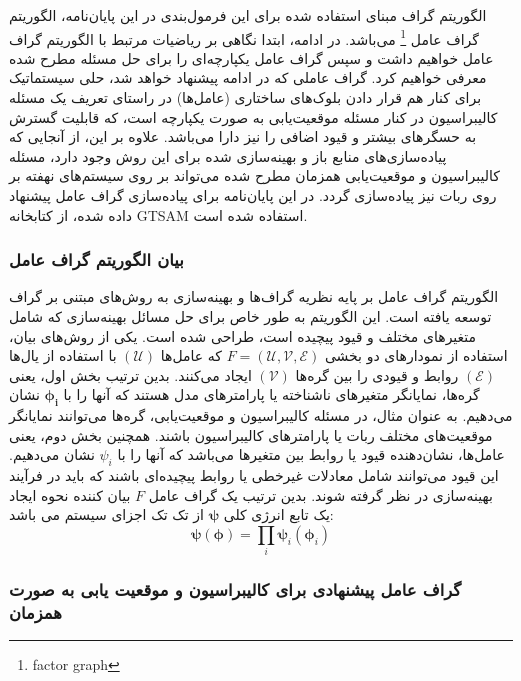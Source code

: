 الگوریتم گراف مبنای استفاده شده برای این فرمول‌بندی در این پایان‌نامه، الگوریتم گراف عامل
\footnote{factor graph}
می‌باشد. در ادامه، ابتدا نگاهی بر ریاضیات مرتبط با الگوریتم گراف عامل خواهیم داشت و سپس گراف عامل یکپارچه‌ای را برای حل مسئله مطرح شده معرفی خواهیم کرد. گراف عاملی که در ادامه پیشنهاد خواهد شد، حلی سیستماتیک برای کنار هم قرار دادن بلوک‌های ساختاری (عامل‌ها) در راستای تعریف یک مسئله کالیبراسیون در کنار مسئله موقعیت‌یابی به صورت یکپارچه است، که قابلیت گسترش به حسگرهای بیشتر و قیود اضافی را نیز دارا می‌باشد. علاوه بر این، از آنجایی که پیاده‌سازی‌های منابع باز و بهینه‌سازی شده برای این روش وجود دارد، مسئله کالیبراسیون و موقعیت‌یابی همزمان مطرح شده می‌تواند بر روی سیستم‌های نهفته بر روی ربات نیز پیاده‌سازی گردد. در این پایان‌نامه برای پیاده‌سازی گراف عامل پیشنهاد داده شده، از کتابخانه GTSAM استفاده شده است. 

\subsubsection{بیان الگوریتم گراف عامل}
الگوریتم گراف عامل بر پایه نظریه گراف‌ها و بهینه‌سازی به روش‌های مبتنی بر گراف توسعه یافته است. این الگوریتم به طور خاص برای حل مسائل بهینه‌سازی که شامل متغیرهای مختلف و قیود پیچیده است، طراحی شده است. یکی از روش‌های بیان، استفاده از نمودارهای دو بخشی
$F = (\mathcal{U}, \mathcal{V}, \mathcal{E})$
که  عامل‌ها 
$(\mathcal{U})$
با استفاده از یال‌ها
$(\mathcal{E})$
روابط و قیودی را بین گره‌ها 
$(\mathcal{V})$
 ایجاد می‌کنند. بدین ترتیب بخش اول، یعنی گره‌ها، نمایانگر متغیرهای ناشناخته یا پارامترهای مدل هستند که آنها را با
$\boldsymbol{\phi_i}$
نشان می‌دهیم. به عنوان مثال، در مسئله کالیبراسیون و موقعیت‌یابی، گره‌ها می‌توانند نمایانگر موقعیت‌های مختلف ربات یا پارامترهای کالیبراسیون باشند. همچنین بخش دوم، یعنی عامل‌ها، نشان‌دهنده قیود یا روابط بین متغیرها می‌باشد که آنها را با
$\psi_i$
نشان می‌دهیم. این قیود می‌توانند شامل معادلات غیرخطی یا روابط پیچیده‌ای باشند که باید در فرآیند بهینه‌سازی در نظر گرفته شوند. بدین ترتیب یک گراف عامل 
$F$
بیان کننده نحوه ایجاد یک تابع انرژی کلی
$\boldsymbol{\psi}$
از تک تک اجزای سیستم می باشد:
\begin{equation} 
	\boldsymbol{\psi}(\boldsymbol{\phi}) = \prod_{i} \boldsymbol{\psi}_i(\boldsymbol{\phi}_i) 
\end{equation}


\subsubsection{گراف عامل پیشنهادی برای کالیبراسیون و موقعیت یابی به صورت همزمان}
  
